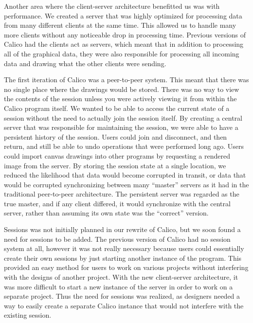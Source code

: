 Another area where the client-server architecture benefitted us was with performance. We created a server that was highly optimized for processing data from many different clients at the same time. This allowed us to handle many more clients without any noticeable drop in processing time. Previous versions of Calico had the clients act as servers, which meant that in addition to processing all of the graphical data, they were also responsible for processing all incoming data and drawing what the other clients were sending.

The first iteration of Calico was a peer-to-peer system. This meant that there was no single place where the drawings would be stored. There was no way to view the contents of the session unless you were actively viewing it from within the Calico program itself. We wanted to be able to access the current state of a session without the need to actually join the session itself. By creating a central server that was responsible for maintaining the session, we were able to have a persistent history of the session. Users could join and disconnect, and then return, and still be able to undo operations that were performed long ago. Users could import canvas drawings into other programs by requesting a rendered image from the server. By storing the session state at a single location, we reduced the likelihood that data would become corrupted in transit, or data that would be corrupted synchronizing between many ``master'' servers as it had in the traditional peer-to-peer architecture. The persistent server was regarded as the true master, and if any client differed, it would synchronize with the central server, rather than assuming its own state was the ``correct'' version.

Sessions was not initially planned in our rewrite of Calico, but we soon found a need for sessions to be added. The previous version of Calico had no session system at all, however it was not really necessary because users could essentially create their own sessions by just starting another instance of the program. This provided an easy method for users to work on various projects without interfering with the designs of another project. With the new client-server architecture, it was more difficult to start a new instance of the server in order to work on a separate project. Thus the need for sessions was realized, as designers needed a way to easily create a separate Calico instance that would not interfere with the existing session. 

